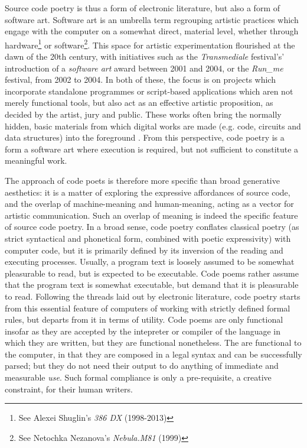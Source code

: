 Source code poetry is thus a form of electronic literature, but also a form of  software art. Software art is an umbrella term regrouping artistic practices which engage with the computer on a somewhat direct, material level, whether through hardware\footnote{See Alexei Shuglin's \emph{386 DX} (1998-2013)} or software\footnote{See Netochka Nezanova's \emph{Nebula.M81} (1999)}. This space for artistic experimentation flourished at the dawn of the 20th century, with initiatives such as the \emph{Transmediale} festival's' introduction of a \emph{software art} award between 2001 and 2004, or the \emph{Run\_me} festival, from 2002 to 2004. In both of these, the focus is on projects which incorporate standalone programmes or script-based applications which aren not merely functional tools, but also act as an effective artistic proposition, as decided by the artist, jury and public. These works often bring the normally hidden, basic materials from which digital works are made (e.g. code, circuits and data structures) into the foreground \citep{yuill_code_2004}. From this perspective, code poetry is a form a software art where execution is required, but not sufficient to constitute a meaningful work.

The approach of code poets is therefore more specific than broad generative aesthetics: it is a matter of exploring the expressive affordances of source code, and the overlap of machine-meaning and human-meaning, acting as a vector for artistic communication. Such an overlap of meaning is indeed the specific feature of source code poetry. In a broad sense, code poetry conflates classical poetry (as strict syntactical and phonetical form, combined with poetic expressivity) with computer code, but it is primarily defined by its inversion of the reading and executing processes. Usually, a program text is loosely assumed to be somewhat pleasurable to read, but is expected to be executable. Code poems rather assume that the program text is somewhat executable, but demand that it is pleasurable to read. Following the threads laid out by electronic literature, code poetry starts from this essential feature of computers of working with strictly defined formal rules, but departs from it in terms of utility. Code poems are only functional insofar as they are accepted by the intepreter or compiler of the language in which they are written, but they are functional nonetheless. The are functional to the computer, in that they are composed in a legal syntax and can be successfully parsed; but they do not need their output to do anything of immediate and measurable \emph{use}. Such formal compliance is only a pre-requisite, a creative constraint, for their human writers.

